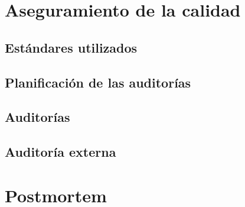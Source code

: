 \documentclass[10pt,spanish]{article}
\let\stdsection\section
\renewcommand\section{\newpage\stdsection}
\begin{document}

\section{Aseguramiento de la calidad}


\subsection{Estándares utilizados}


\subsection{Planificación de las auditorías}


\subsection{Auditorías}


\subsection{Auditoría externa}



\section{Postmortem}

\end{document}
